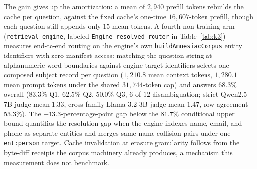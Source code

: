 \documentclass{article}
\begin{document}
The gain gives up the amortization: a mean of $2{,}940$ prefill tokens rebuilds the cache per question, against the fixed cache's one-time $16{,}607$-token prefill, though each question still appends only $15$ mean tokens. A fourth non-training arm (\texttt{retrieval\_engine}, labeled \texttt{Engine-resolved router} in Table~\ref{tab:k3}) measures end-to-end routing on the engine's own \texttt{buildAmnesiacCorpus} entity identifiers with zero manifest access: matching the question string at alphanumeric word boundaries against engine target identifiers selects one composed subject record per question ($1{,}210.8$ mean context tokens, $1{,}280.1$ mean prompt tokens under the shared $31{,}744$-token cap) and answers $68.3\%$ overall ($83.3\%$ Q1, $62.5\%$ Q2, $50.0\%$ Q3, $6$ of $12$ disambiguation; strict Qwen2.5-7B judge mean $1.33$, cross-family Llama-3.2-3B judge mean $1.47$, row agreement $53.3\%$). The $-13.3$-percentage-point gap below the $81.7\%$ conditional upper bound quantifies the resolution gap when the engine indexes name, email, and phone as separate entities and merges same-name collision pairs under one \texttt{ent:person} target. Cache invalidation at erasure granularity follows from the byte-diff receipts the corpus machinery already produces, a mechanism this measurement does not benchmark.
\end{document}
